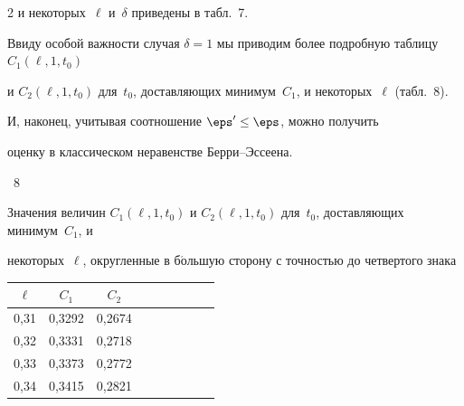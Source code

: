 \begin{multicols}{2}
и некоторых~$\ell$ и~$\delta$ приведены в табл.~7.








Ввиду особой важности случая $\delta=1$ мы приводим более подробную таблицу $C_1(\ell,1,t_0)$


и $C_2(\ell,1,t_0)$ для~$t_0$, доставляющих минимум~$C_1$, и некоторых~$\ell$ (табл.~8).








И, наконец, учитывая соотношение $\eps'\le\eps$, можно получить


оценку в классическом неравенстве Берри--Эссеена.





\noindent %


\begin{center}


\parbox{60mm}{{\tablename~8}\ \ \small{Значения величин $C_1(\ell,1,t_0)$ и $C_2(\ell,1,t_0)$ для~$t_0$, доставляющих минимум~$C_1$, и


некоторых~$\ell$, округленные в б$\acute{\mbox{о}}$льшую сторону с точностью до четвертого знака}}


\end{center}







{\small


\begin{center}


\tabcolsep=17pt


\begin{tabular}{|c|c|c|c|c|c|c|c|c|}


\hline


$\ell$&$C_1$&$C_2$\\


\hline


0,31  & 0,3292  & 0,2674  \\


0,32  & 0,3331  & 0,2718  \\


0,33  & 0,3373  & 0,2772  \\


0,34  & 0,3415  & 0,2821  \\



\end{tabular}
\end{center}}
\end{multicols}
